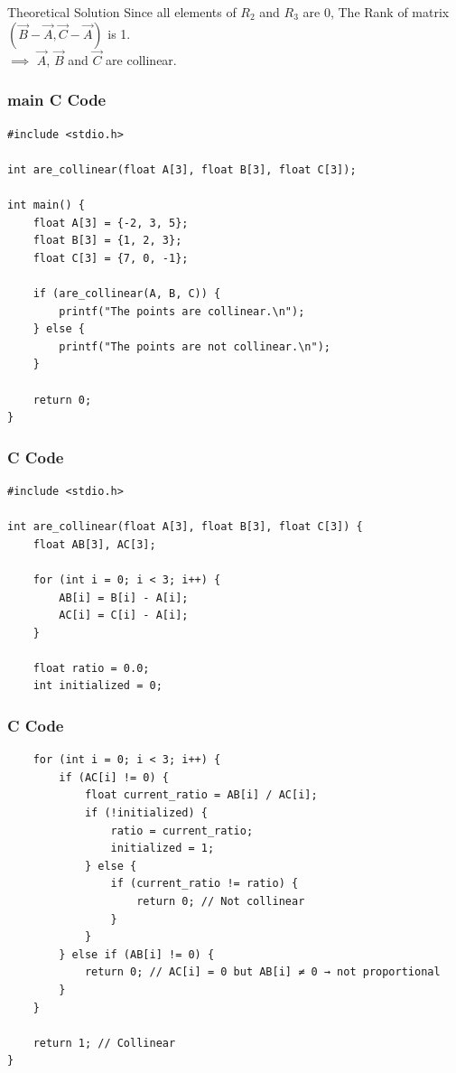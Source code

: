 \documentclass{beamer}
\begin{document}
\begin{frame}{Theoretical Solution}
Since all elements of $R_2$ and $R_3$ are 0, The Rank of matrix $(\vec{B} - \vec{A},\vec{C} - \vec{A})$ is 1.  \\
$\implies$ $\vec{A}$, $\vec{B}$ and $\vec{C}$ are collinear.
\end{frame}


\begin{frame}[fragile]
    \frametitle{main C Code}

    \begin{lstlisting}
#include <stdio.h>

int are_collinear(float A[3], float B[3], float C[3]);

int main() {
    float A[3] = {-2, 3, 5};
    float B[3] = {1, 2, 3};
    float C[3] = {7, 0, -1};

    if (are_collinear(A, B, C)) {
        printf("The points are collinear.\n");
    } else {
        printf("The points are not collinear.\n");
    }

    return 0;
}
    \end{lstlisting}
\end{frame}

\begin{frame}[fragile]
    \frametitle{C Code}

    \begin{lstlisting}
#include <stdio.h>

int are_collinear(float A[3], float B[3], float C[3]) {
    float AB[3], AC[3];

    for (int i = 0; i < 3; i++) {
        AB[i] = B[i] - A[i];
        AC[i] = C[i] - A[i];
    }

    float ratio = 0.0;
    int initialized = 0;
    \end{lstlisting}
\end{frame}

\begin{frame}[fragile]
    \frametitle{C Code}

    \begin{lstlisting}
    for (int i = 0; i < 3; i++) {
        if (AC[i] != 0) {
            float current_ratio = AB[i] / AC[i];
            if (!initialized) {
                ratio = current_ratio;
                initialized = 1;
            } else {
                if (current_ratio != ratio) {
                    return 0; // Not collinear
                }
            }
        } else if (AB[i] != 0) {
            return 0; // AC[i] = 0 but AB[i] ≠ 0 → not proportional
        }
    }

    return 1; // Collinear
}
    \end{lstlisting}
\end{frame}
\end{document}
